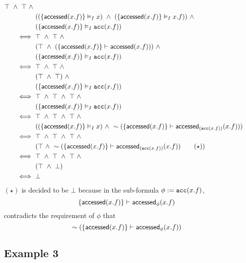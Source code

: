 \begin{align*}
\top \ \land \ \top \ \land \\ & \
((\left\{  \textsf{accessed}(x.f)  \right\} \vDash_I x) \ \land \
  (\left\{  \textsf{accessed}(x.f)  \right\} \vDash_I x.f)) \ \land \\ & \
(\left\{  \textsf{accessed}(x.f)  \right\} \vDash_I \texttt{acc}(x.f))
\\ \iff & \
\top \ \land \ \top \ \land \\ & \
(\top \ \land \
  (\left\{  \textsf{accessed}(x.f)  \right\} \vdash \textsf{accessed}(x.f))) \ \land \\ & \
(\left\{  \textsf{accessed}(x.f)  \right\} \vDash_I \texttt{acc}(x.f))
\\ \iff & \
\top \ \land \ \top \ \land \\ & \
(\top \ \land \ \top) \ \land \\ & \
(\left\{  \textsf{accessed}(x.f)  \right\} \vDash_I \texttt{acc}(x.f))
\\ \iff & \
\top \ \land \ \top \ \land \ \top \ \land \\ & \
(\left\{  \textsf{accessed}(x.f)  \right\} \vDash_I \texttt{acc}(x.f))
\\ \iff & \
\top \ \land \ \top \ \land \ \top \ \land \\ & \
(
  (\left\{  \textsf{accessed}(x.f)  \right\} \vDash_I x) \ \land \
  \sim (\left\{  \textsf{accessed}(x.f)  \right\} \vdash \textsf{accessed}_{(\texttt{acc}(x.f))}(x.f))
)
\\ \iff & \
\top \ \land \ \top \ \land \ \top \ \land \\ & \
(
  \top \ \land \
  \sim (\left\{  \textsf{accessed}(x.f)  \right\} \vdash \textsf{accessed}_{(\texttt{acc}(x.f))}(x.f)) \tag{$\star$}
)
\\ \iff & \
\top \ \land \ \top \ \land \ \top \ \land \\ & \
(
  \top \ \land \
  \bot
)
\\ \iff & \
\bot
\end{align*}
$(\star)$ is decided to be $\bot$ because in the sub-formula $\phi := \texttt{acc}(x.f)$,
$$
  \left\{  \textsf{accessed}(x.f)  \right\} \vdash \textsf{accessed}_{\phi}(x.f)
$$
contradicts the requirement of $\phi$ that
$$
  \sim (\left\{  \textsf{accessed}(x.f)  \right\} \vdash \textsf{accessed}_{\phi}(x.f))
$$

\subsection*{Example 3}

